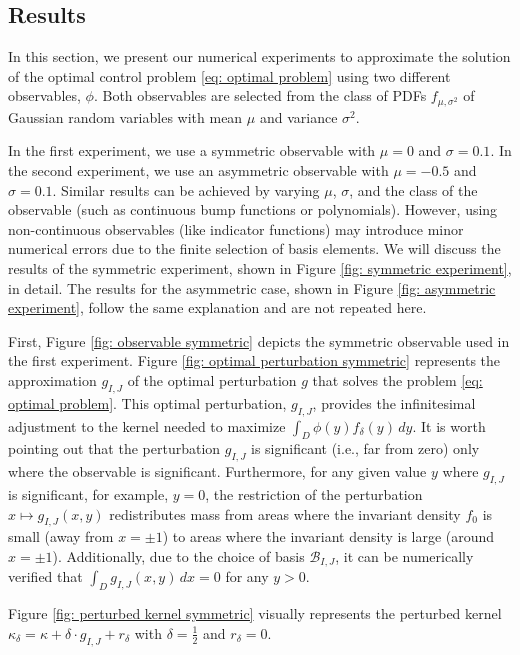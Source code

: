 \documentclass{amsart}
\begin{document}
\subsection{Results}
\label{sec: results}
In this section, we present our numerical experiments to approximate the solution of the optimal control problem \eqref{eq: optimal problem} using two different observables, \( \phi \). Both observables are selected from the class of PDFs \( f_{\mu, \sigma^2} \) of Gaussian random variables with mean \( \mu \) and variance \( \sigma^2 \).

In the first experiment, we use a symmetric observable with \( \mu = 0 \) and \( \sigma = 0.1 \). In the second experiment, we use an asymmetric observable with \( \mu = -0.5 \) and \( \sigma = 0.1 \). Similar results can be achieved by varying \( \mu \), \( \sigma \), and the class of the observable (such as continuous bump functions or polynomials). However, using non-continuous observables (like indicator functions) may introduce minor numerical errors due to the finite selection of basis elements. We will discuss the results of the symmetric experiment, shown in Figure \ref{fig: symmetric experiment}, in detail. The results for the asymmetric case, shown in Figure \ref{fig: asymmetric experiment}, follow the same explanation and are not repeated here.

First, Figure \ref{fig: observable symmetric} depicts the symmetric observable used in the first experiment. Figure \ref{fig: optimal perturbation symmetric} represents the approximation $g_{I,J}$ of the optimal perturbation $g$ that solves the problem \eqref{eq: optimal problem}. This optimal perturbation, \( g_{I,J}\), provides the infinitesimal adjustment to the kernel needed to maximize \( \int_D \phi(y) f_{\delta}(y) \, dy \). It is worth pointing out that the perturbation \( g_{I,J} \) is significant (i.e., far from zero) only where the observable is significant. Furthermore, for any given value \( y \) where \( g_{I,J} \) is significant, for example, \( y = 0 \), the restriction of the perturbation \( x \mapsto g_{I,J}(x,y) \) redistributes mass from areas where the invariant density \( f_0 \) is small (away from \( x = \pm 1 \)) to areas where the invariant density is large (around \( x = \pm 1 \)). Additionally, due to the choice of basis $\mathcal{B}_{I,J}$, it can be numerically verified that \( \int_D g_{I,J}(x,y) \, dx = 0 \) for any \( y > 0 \).

Figure \ref{fig: perturbed kernel symmetric} visually represents the perturbed kernel \( \kappa_\delta = \kappa + \delta \cdot g_{I,J} + r_\delta \) with \( \delta = \frac{1}{2} \) and \( r_\delta = 0 \).
\end{document}
